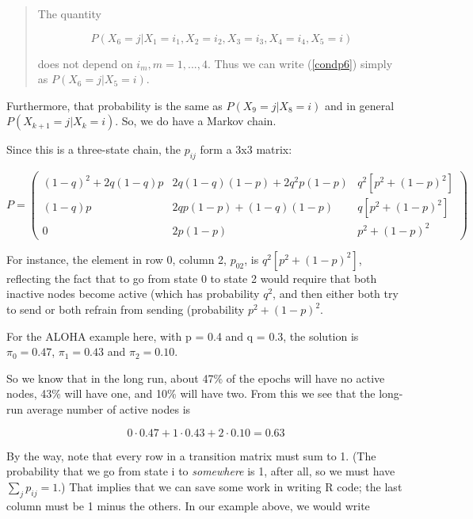 \begin{quote}

The quantity

\begin{equation}
\label{condp6}
P(X_6 = j | X_1 = i_1, X_2 = i_2, X_3 = i_3, X_4 = i_4, X_5 = i)
\end{equation}

\noindent 
does not depend on $i_m, m = 1,...,4$.  Thus we can write (\ref{condp6})
simply as $P(X_6 = j | X_5 = i)$.  

\end{quote}

Furthermore, that probability is the same as $P(X_9 = j | X_8 = i)$ and
in general $P(X_{k+1} = j | X_k = i)$.  So, we do have a Markov chain.

Since this is a three-state chain, the $p_{ij}$ form a 3x3 matrix:

\begin{equation}
P = 
\left (
\begin{array}{ccc}
(1-q)^2 + 2q(1-q)p & 
   2q(1-q)(1-p) + 2q^2p(1-p) & 
   q^2 [p^2+(1-p)^2] \\
(1-q) p & 
   2qp(1-p) + (1-q)(1-p) & 
   q[p^2+(1-p)^2] \\
0 & 
   2p(1-p) & 
   p^2+(1-p)^2
\end{array}
\right )
\end{equation}

For instance, the element in row 0, column 2, $p_{02}$, is
$q^2[p^2+(1-p)^2]$, reflecting the fact that to go from state 0 to state
2 would require that both inactive nodes become active (which has
probability $q^2$, and then either both try to send or both refrain from
sending (probability $p^2+(1-p)^2$.

For the ALOHA example here, with p = 0.4 and q = 0.3, the solution is
$\pi_0 = 0.47$, $\pi_1 = 0.43$ and $\pi_2 = 0.10$.

So we know that in the long run, about 47\% of the epochs will have no
active nodes, 43\% will have one, and 10\% will have two.  From this we
see that the long-run average number of active nodes is

\begin{equation}
0 \cdot 0.47 + 1 \cdot 0.43 + 2 \cdot 0.10 = 0.63
\end{equation}

By the way, note that every row in a transition matrix must sum to 1.
(The probability that we go from state i to {\it somewhere} is 1, after
all, so we must have $\sum_j p_{ij} = 1$.)  That implies that we can
save some work in writing R code; the last column must be 1 minus the
others.  In our example above, we would write

